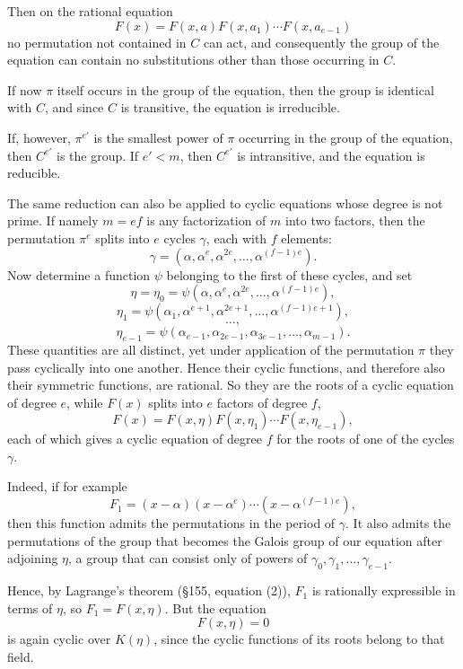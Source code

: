 \documentclass[11pt,a4paper]{book}
\begin{document}
Then on the rational equation
\[
F(x)=F(x,a)F(x,a_1)\cdots F(x,a_{e-1})
\]
no permutation not contained in $C$ can act, and consequently the group of the equation can contain no substitutions other than those occurring in $C$.

If now $\pi$ itself occurs in the group of the equation, then the group is identical with $C$, and since $C$ is transitive, the equation is irreducible.

If, however, $\pi^{e'}$ is the smallest power of $\pi$ occurring in the group of the equation, then $C^{e'}$ is the group. If $e'<m$, then $C^{e'}$ is intransitive, and the equation is reducible.

The same reduction can also be applied to cyclic equations whose degree is not prime. If namely $m=ef$ is any factorization of $m$ into two factors, then the permutation $\pi^e$ splits into $e$ cycles $\gamma$, each with $f$ elements:
\[
\gamma=(\alpha,\alpha^e,\alpha^{2e},\dots,\alpha^{(f-1)e}).
\tag{9}
\]
Now determine a function $\psi$ belonging to the first of these cycles, and set
\[
\eta=\eta_0=\psi(\alpha,\alpha^e,\alpha^{2e},\dots,\alpha^{(f-1)e}),
\]
\[
\eta_1=\psi(\alpha_1,\alpha^{e+1},\alpha^{2e+1},\dots,\alpha^{(f-1)e+1}),
\]
\[
\dots,
\]
\[
\eta_{e-1}=\psi(\alpha_{e-1},\alpha_{2e-1},\alpha_{3e-1},\dots,\alpha_{m-1}).
\tag{10}
\]
These quantities are all distinct, yet under application of the permutation $\pi$ they pass cyclically into one another. Hence their cyclic functions, and therefore also their symmetric functions, are rational. So they are the roots of a cyclic equation of degree $e$, while $F(x)$ splits into $e$ factors of degree $f$,
\[
F(x)=F(x,\eta)F(x,\eta_1)\cdots F(x,\eta_{e-1}),
\]
each of which gives a cyclic equation of degree $f$ for the roots of one of the cycles $\gamma$.

Indeed, if for example
\[
F_1=(x-\alpha)(x-\alpha^e)\cdots(x-\alpha^{(f-1)e}),
\]
then this function admits the permutations in the period of $\gamma$. It also admits the permutations of the group that becomes the Galois group of our equation after adjoining $\eta$, a group that can consist only of powers of $\gamma_0,\gamma_1,\dots,\gamma_{e-1}$.

Hence, by Lagrange's theorem (\S 155, equation (2)), $F_1$ is rationally expressible in terms of $\eta$, so $F_1=F(x,\eta)$. But the equation
\[
F(x,\eta)=0
\]
is again cyclic over $K(\eta)$, since the cyclic functions of its roots belong to that field.
\end{document}
